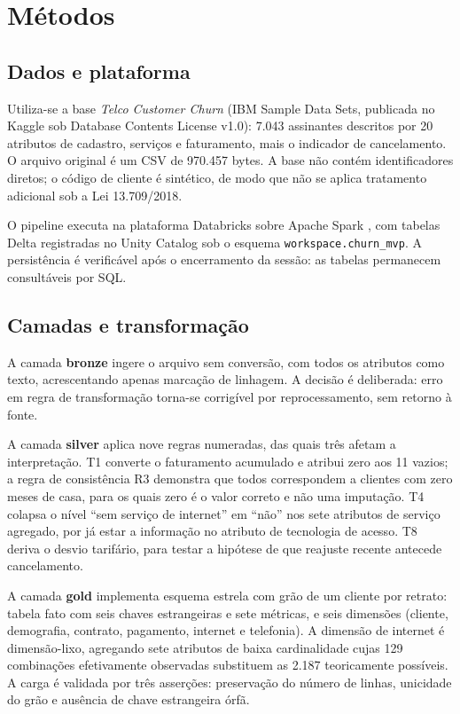 \documentclass[10pt,a4paper]{article}
\begin{document}
\section{Métodos}
\label{sec:metodos}

\subsection{Dados e plataforma}

Utiliza-se a base \emph{Telco Customer Churn} (IBM Sample Data Sets, publicada no Kaggle
sob Database Contents License v1.0): 7.043 assinantes descritos por 20 atributos de
cadastro, serviços e faturamento, mais o indicador de cancelamento. O arquivo original é
um CSV de 970.457 bytes. A base não contém identificadores diretos; o código de cliente é
sintético, de modo que não se aplica tratamento adicional sob a Lei 13.709/2018.

O pipeline executa na plataforma Databricks sobre Apache Spark \cite{zaharia}, com tabelas Delta registradas no Unity
Catalog sob o esquema \texttt{workspace.churn\_mvp}. A persistência é verificável após o
encerramento da sessão: as tabelas permanecem consultáveis por SQL.

\subsection{Camadas e transformação}

A camada \textbf{bronze} ingere o arquivo sem conversão, com todos os atributos como texto,
acrescentando apenas marcação de linhagem. A decisão é deliberada: erro em regra de
transformação torna-se corrigível por reprocessamento, sem retorno à fonte.

A camada \textbf{silver} aplica nove regras numeradas, das quais três afetam a interpretação.
T1 converte o faturamento acumulado e atribui zero aos 11 vazios; a regra de consistência R3
demonstra que todos correspondem a clientes com zero meses de casa, para os quais zero é o
valor correto e não uma imputação. T4 colapsa o nível ``sem serviço de internet'' em ``não''
nos sete atributos de serviço agregado, por já estar a informação no atributo de tecnologia
de acesso. T8 deriva o desvio tarifário, para testar a hipótese de que reajuste recente
antecede cancelamento.

A camada \textbf{gold} implementa esquema estrela com grão de um cliente por retrato:
tabela fato com seis chaves estrangeiras e sete métricas, e seis dimensões
(cliente, demografia, contrato, pagamento, internet e telefonia). A dimensão de internet
é dimensão-lixo, agregando sete atributos de baixa cardinalidade cujas 129 combinações
efetivamente observadas substituem as 2.187 teoricamente possíveis. A carga é validada
por três asserções: preservação do número de linhas, unicidade do grão e ausência de
chave estrangeira órfã.
\end{document}
